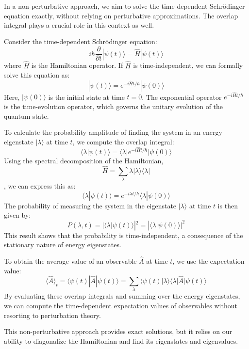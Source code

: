 \documentclass{article}
\begin{document}
\date{}

\maketitle

In a non-perturbative approach, we aim to solve the time-dependent
Schr{\"o}dinger equation exactly, without relying on perturbative
approximations. The overlap integral plays a crucial role in this context as
well.

Consider the time-dependent Schr{\"o}dinger equation:
\begin{equation}
  i \hbar \frac{\partial}{\partial t} | \psi (t) \rangle = \hat{H} | \psi (t)
  \rangle
\end{equation}
where $\hat{H}$ is the Hamiltonian operator. If $\hat{H}$ is time-independent,
we can formally solve this equation as:
\begin{equation}
  | \psi (t) \rangle = e^{- i \hat{H} t / \hbar} | \psi (0) \rangle
\end{equation}
Here, $| \psi (0) \rangle$ is the initial state at time $t = 0$. The
exponential operator $e^{- i \hat{H} t / \hbar}$ is the time-evolution
operator, which governs the unitary evolution of the quantum state.

To calculate the probability amplitude of finding the system in an energy
eigenstate $| \lambda \rangle$ at time $t$, we compute the overlap integral:
\[ \langle \lambda | \psi (t) \rangle = \langle \lambda |e^{- i \hat{H} t /
   \hbar} | \psi (0) \rangle \]
Using the spectral decomposition of the Hamiltonian,
\begin{equation}
  \hat{H} = \sum_{\lambda} \lambda | \lambda \rangle \langle \lambda |
\end{equation}
, we can express this as:
\[ \langle \lambda | \psi (t) \rangle = e^{- i \lambda t / \hbar} \langle
   \lambda | \psi (0) \rangle \]
The probability of measuring the system in the eigenstate $| \lambda \rangle$
at time $t$ is then given by:
\begin{equation}
  P (\lambda, t) = | \langle \lambda | \psi (t) \rangle |^2 = | \langle
  \lambda | \psi (0) \rangle |^2
\end{equation}
This result shows that the probability is time-independent, a consequence of
the stationary nature of energy eigenstates.

To obtain the average value of an observable $\hat{A}$ at time $t$, we use the
expectation value:
\begin{equation}
  \langle \hat{A} \rangle_t = \langle \psi (t) | \hat{A} | \psi (t) \rangle =
  \sum_{\lambda} \langle \psi (t) | \lambda \rangle  \langle \lambda | \hat{A}
  | \psi (t) \rangle
\end{equation}
By evaluating these overlap integrals and summing over the energy eigenstates,
we can compute the time-dependent expectation values of observables without
resorting to perturbation theory.

This non-perturbative approach provides exact solutions, but it relies on our
ability to diagonalize the Hamiltonian and find its eigenstates and
eigenvalues.
\end{document}
